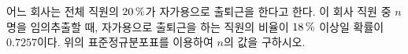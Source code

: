 \noindent\begin{minipage}[t]{0.58\linewidth}\vspace{0pt}\raggedright 어느 회사는 전체 직원의 $20\mkern3mu \%$가 자가용으로 출퇴근을 한다고 한다. 이 회사 직원 중 $n$명을 임의추출할 때, 자가용으로 출퇴근을 하는 직원의 비율이 $18\mkern3mu \%$ 이상일 확률이 $0.7257$이다. 위의 표준정규분포표를 이용하여 $n$의 값을 구하시오.\end{minipage}\hfill\begin{minipage}[t]{0.4\linewidth}\vspace{0pt}\centering \resizebox{\ifdim\width>\linewidth\linewidth\else\width\fi}{!}{}\end{minipage}\par
